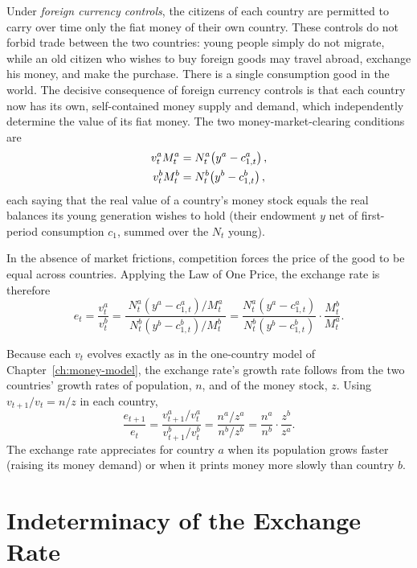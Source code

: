 Under \emph{foreign currency controls}, the citizens of each country are permitted to carry over time only the fiat money of their own country. These controls do not forbid trade between the two countries: young people simply do not migrate, while an old citizen who wishes to buy foreign goods may travel abroad, exchange his money, and make the purchase. There is a single consumption good in the world. The decisive consequence of foreign currency controls is that each country now has its own, self-contained money supply and demand, which independently determine the value of its fiat money. The two money-market-clearing conditions are
\[
\begin{aligned}
v_t^a M_t^a &= N_t^a\!\left(y^a - c_{1,t}^a\right),\\
v_t^b M_t^b &= N_t^b\!\left(y^b - c_{1,t}^b\right),
\end{aligned}
\]
each saying that the real value of a country's money stock equals the real balances its young generation wishes to hold (their endowment $y$ net of first-period consumption $c_1$, summed over the $N_t$ young).

In the absence of market frictions, competition forces the price of the good to be equal across countries. Applying the Law of One Price, the exchange rate is therefore
\[
e_t = \frac{v_t^a}{v_t^b}
= \frac{\;N_t^a\!\left(y^a - c_{1,t}^a\right)/M_t^a\;}{\;N_t^b\!\left(y^b - c_{1,t}^b\right)/M_t^b\;}
= \frac{N_t^a\!\left(y^a - c_{1,t}^a\right)}{N_t^b\!\left(y^b - c_{1,t}^b\right)} \cdot \frac{M_t^b}{M_t^a}.
\]


Because each $v_t$ evolves exactly as in the one-country model of Chapter~\ref{ch:money-model}, the exchange rate's growth rate follows from the two countries' growth rates of population, $n$, and of the money stock, $z$. Using $v_{t+1}/v_t = n/z$ in each country,
\[
\frac{e_{t+1}}{e_t}
= \frac{v_{t+1}^a / v_t^a}{v_{t+1}^b / v_t^b}
= \frac{n^a / z^a}{n^b / z^b}
= \frac{n^a}{n^b} \cdot \frac{z^b}{z^a}.
\]
The exchange rate appreciates for country $a$ when its population grows faster (raising its money demand) or when it prints money more slowly than country $b$.

\section{Indeterminacy of the Exchange Rate}

